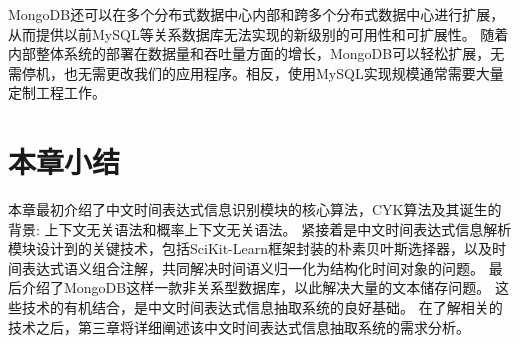 MongoDB还可以在多个分布式数据中心内部和跨多个分布式数据中心进行扩展，从而提供以前MySQL等关系数据库无法实现的新级别的可用性和可扩展性。
随着内部整体系统的部署在数据量和吞吐量方面的增长，MongoDB可以轻松扩展，无需停机，也无需更改我们的应用程序。相反，使用MySQL实现规模通常需要大量定制工程工作。

\section{本章小结}

本章最初介绍了中文时间表达式信息识别模块的核心算法，CYK算法及其诞生的背景: 上下文无关语法和概率上下文无关语法。 
紧接着是中文时间表达式信息解析模块设计到的关键技术，包括SciKit-Learn框架封装的朴素贝叶斯选择器，以及时间表达式语义组合注解，共同解决时间语义归一化为结构化时间对象的问题。
最后介绍了MongoDB这样一款非关系型数据库，以此解决大量的文本储存问题。 这些技术的有机结合，是中文时间表达式信息抽取系统的良好基础。
在了解相关的技术之后，第三章将详细阐述该中文时间表达式信息抽取系统的需求分析。
